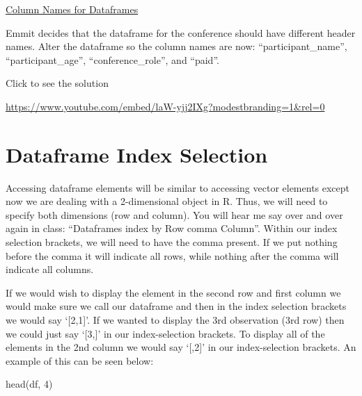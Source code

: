\documentclass[
  letterpaper,
  DIV=11,
  numbers=noendperiod]{scrreprt}
\newenvironment{Shaded}{\begin{snugshade}}{\end{snugshade}}
\newcommand{\DecValTok}[1]{\textcolor[rgb]{0.68,0.00,0.00}{#1}}
\newcommand{\FunctionTok}[1]{\textcolor[rgb]{0.28,0.35,0.67}{#1}}
\newcommand{\NormalTok}[1]{\textcolor[rgb]{0.00,0.23,0.31}{#1}}
\begin{document}
\begin{watch}{}{}
    \href{https://youtu.be/jzJfkWANAMU}{Column Names for Dataframes}
\end{watch}

\begin{tcolorbox}[enhanced jigsaw, leftrule=.75mm, arc=.35mm, coltitle=black, rightrule=.15mm, bottomrule=.15mm, toprule=.15mm, left=2mm, colbacktitle=quarto-callout-tip-color!10!white, title=\textcolor{quarto-callout-tip-color}{\faLightbulb}\hspace{0.5em}{Try it Out}, toptitle=1mm, breakable, colframe=quarto-callout-tip-color-frame, bottomtitle=1mm, titlerule=0mm, colback=white, opacityback=0, opacitybacktitle=0.6]

Emmit decides that the dataframe for the conference should have
different header names. Alter the dataframe so the column names are now:
``participant\_name'', ``participant\_age'', ``conference\_role'', and
``paid''.

Click to see the solution

\url{https://www.youtube.com/embed/laW-yjj2IXg?modestbranding=1&rel=0}

\end{tcolorbox}

\section{Dataframe Index Selection}\label{dataframe-index-selection}

Accessing dataframe elements will be similar to accessing vector
elements except now we are dealing with a 2-dimensional object in R.
Thus, we will need to specify both dimensions (row and column). You will
hear me say over and over again in class: ``Dataframes index by Row
comma Column''. Within our index selection brackets, we will need to
have the comma present. If we put nothing before the comma it will
indicate all rows, while nothing after the comma will indicate all
columns.

If we would wish to display the element in the second row and first
column we would make sure we call our dataframe and then in the index
selection brackets we would say `{[}2,1{]}'. If we wanted to display the
3rd observation (3rd row) then we could just say `{[}3,{]}' in our
index-selection brackets. To display all of the elements in the 2nd
column we would say `{[},2{]}' in our index-selection brackets. An
example of this can be seen below:

\begin{Shaded}
\begin{Highlighting}[]
\FunctionTok{head}\NormalTok{(df, }\DecValTok{4}\NormalTok{)}
\end{Highlighting}
\end{Shaded}
\end{document}
